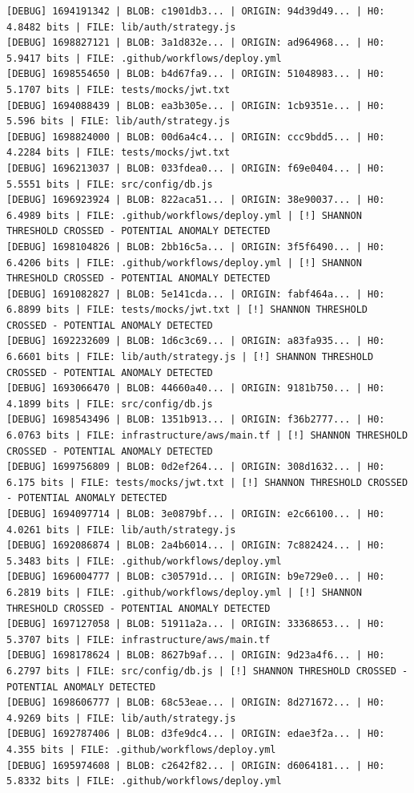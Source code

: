 \documentclass[12pt, a4paper, oneside]{report}
\begin{document}
\begin{lstlisting}[basicstyle=\tiny\ttfamily]
[DEBUG] 1694191342 | BLOB: c1901db3... | ORIGIN: 94d39d49... | H0: 4.8482 bits | FILE: lib/auth/strategy.js
[DEBUG] 1698827121 | BLOB: 3a1d832e... | ORIGIN: ad964968... | H0: 5.9417 bits | FILE: .github/workflows/deploy.yml
[DEBUG] 1698554650 | BLOB: b4d67fa9... | ORIGIN: 51048983... | H0: 5.1707 bits | FILE: tests/mocks/jwt.txt
[DEBUG] 1694088439 | BLOB: ea3b305e... | ORIGIN: 1cb9351e... | H0: 5.596 bits | FILE: lib/auth/strategy.js
[DEBUG] 1698824000 | BLOB: 00d6a4c4... | ORIGIN: ccc9bdd5... | H0: 4.2284 bits | FILE: tests/mocks/jwt.txt
[DEBUG] 1696213037 | BLOB: 033fdea0... | ORIGIN: f69e0404... | H0: 5.5551 bits | FILE: src/config/db.js
[DEBUG] 1696923924 | BLOB: 822aca51... | ORIGIN: 38e90037... | H0: 6.4989 bits | FILE: .github/workflows/deploy.yml | [!] SHANNON THRESHOLD CROSSED - POTENTIAL ANOMALY DETECTED
[DEBUG] 1698104826 | BLOB: 2bb16c5a... | ORIGIN: 3f5f6490... | H0: 6.4206 bits | FILE: .github/workflows/deploy.yml | [!] SHANNON THRESHOLD CROSSED - POTENTIAL ANOMALY DETECTED
[DEBUG] 1691082827 | BLOB: 5e141cda... | ORIGIN: fabf464a... | H0: 6.8899 bits | FILE: tests/mocks/jwt.txt | [!] SHANNON THRESHOLD CROSSED - POTENTIAL ANOMALY DETECTED
[DEBUG] 1692232609 | BLOB: 1d6c3c69... | ORIGIN: a83fa935... | H0: 6.6601 bits | FILE: lib/auth/strategy.js | [!] SHANNON THRESHOLD CROSSED - POTENTIAL ANOMALY DETECTED
[DEBUG] 1693066470 | BLOB: 44660a40... | ORIGIN: 9181b750... | H0: 4.1899 bits | FILE: src/config/db.js
[DEBUG] 1698543496 | BLOB: 1351b913... | ORIGIN: f36b2777... | H0: 6.0763 bits | FILE: infrastructure/aws/main.tf | [!] SHANNON THRESHOLD CROSSED - POTENTIAL ANOMALY DETECTED
[DEBUG] 1699756809 | BLOB: 0d2ef264... | ORIGIN: 308d1632... | H0: 6.175 bits | FILE: tests/mocks/jwt.txt | [!] SHANNON THRESHOLD CROSSED - POTENTIAL ANOMALY DETECTED
[DEBUG] 1694097714 | BLOB: 3e0879bf... | ORIGIN: e2c66100... | H0: 4.0261 bits | FILE: lib/auth/strategy.js
[DEBUG] 1692086874 | BLOB: 2a4b6014... | ORIGIN: 7c882424... | H0: 5.3483 bits | FILE: .github/workflows/deploy.yml
[DEBUG] 1696004777 | BLOB: c305791d... | ORIGIN: b9e729e0... | H0: 6.2819 bits | FILE: .github/workflows/deploy.yml | [!] SHANNON THRESHOLD CROSSED - POTENTIAL ANOMALY DETECTED
[DEBUG] 1697127058 | BLOB: 51911a2a... | ORIGIN: 33368653... | H0: 5.3707 bits | FILE: infrastructure/aws/main.tf
[DEBUG] 1698178624 | BLOB: 8627b9af... | ORIGIN: 9d23a4f6... | H0: 6.2797 bits | FILE: src/config/db.js | [!] SHANNON THRESHOLD CROSSED - POTENTIAL ANOMALY DETECTED
[DEBUG] 1698606777 | BLOB: 68c53eae... | ORIGIN: 8d271672... | H0: 4.9269 bits | FILE: lib/auth/strategy.js
[DEBUG] 1692787406 | BLOB: d3fe9dc4... | ORIGIN: edae3f2a... | H0: 4.355 bits | FILE: .github/workflows/deploy.yml
[DEBUG] 1695974608 | BLOB: c2642f82... | ORIGIN: d6064181... | H0: 5.8332 bits | FILE: .github/workflows/deploy.yml
\end{lstlisting}
\end{document}
